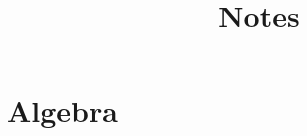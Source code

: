 \documentclass[letterpaper,11pt]{report}
\begin{document}
\makeatletter
\newtheorem*{rep@theorem}{\rep@title}
\newcommand{\newreptheorem}[2]{%
\newenvironment{rep#1}[1]{%
 \def\rep@title{#2 \ref{##1}}%
 \begin{rep@theorem}}%
 {\end{rep@theorem}}}
\makeatother

\newtheorem{thm}{Theorem}
\newreptheorem{thm}{Theorem}
\newtheorem{prop}{Proposition}
\newtheorem{cor}{Corollary}
\newtheorem{lem}{Lemma}
\newreptheorem{lem}{Lemma}

\theoremstyle{definition}
\newtheorem{defn}{Definition}
\newtheorem{conj}{Conjecture}
\newtheorem{prob}{Problem}

\theoremstyle{remark}
\newtheorem{rem}{Remark}
\newtheorem{ex}{Example}
\newtheorem{exer}{Exercise}

\newcommand{\Rho}{\mathrm{P}}
\newcommand{\cS}{\mathcal{S}}
\newcommand{\cM}{\mathcal{M}}
\newcommand{\cN}{\mathcal{N}}
\newcommand{\gk}{\kappa}
\newcommand{\gS}{\Sigma}
\newcommand{\gl}{\lambda}
\newcommand{\gt}{\theta}

\newcommand{\cF}{\mathcal{F}}
\newcommand{\cG}{\mathcal{G}}
\newcommand{\cP}{\mathcal{P}}
\newcommand{\cV}{\mathcal{V}}
\newcommand{\cB}{\mathcal{B}}
\newcommand{\cA}{\mathcal{A}}
\newcommand{\ZZ}{\mathbb{Z}}
\newcommand{\NN}{\mathbb{N}}
\newcommand{\QQ}{\mathbb{Q}}
\newcommand{\bA}{\mathbb{A}}
\newcommand{\bB}{\mathbb{B}}
\newcommand{\bC}{\mathbb{C}}
\newcommand{\bD}{\mathbb{D}}
\newcommand{\bE}{\mathbb{E}}
\newcommand{\bF}{\mathbb{F}}
\newcommand{\bI}{\mathbb{I}}
\newcommand{\bP}{\mathbb{P}}
\newcommand{\bS}{\mathbb{S}}
\newcommand{\fA}{\mathbf{A}}
\newcommand{\fB}{\mathbf{B}}

\newcommand{\RR}{\mathbb{R}}
\newcommand{\CC}{\mathbb{C}}
\newcommand{\FF}{\mathbb{F}}
\newcommand{\HH}{\mathbb{H}}
\newcommand{\PP}{\mathbb{P}}
\newcommand{\EE}{\mathbb{E}}

\newcommand{\cD}{\mathcal{D}}
\newcommand{\cK}{\mathcal{K}}
\newcommand{\cL}{\mathcal{L}}
\newcommand{\cO}{\mathcal{O}}

\newcommand{\fp}{\mathfrak{p}}

\newcommand{\dotcup}{\ensuremath{\mathaccent\cdot\cup}}

\title{Notes}
\date{}
\author{}
\maketitle

\tableofcontents


\chapter{Algebra}
\end{document}
